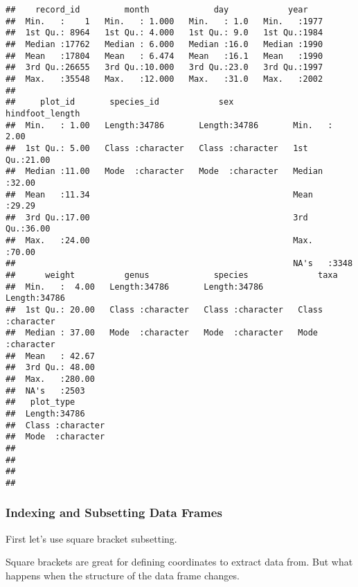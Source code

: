 \documentclass[]{article}
\begin{document}
\begin{verbatim}
##    record_id         month             day            year     
##  Min.   :    1   Min.   : 1.000   Min.   : 1.0   Min.   :1977  
##  1st Qu.: 8964   1st Qu.: 4.000   1st Qu.: 9.0   1st Qu.:1984  
##  Median :17762   Median : 6.000   Median :16.0   Median :1990  
##  Mean   :17804   Mean   : 6.474   Mean   :16.1   Mean   :1990  
##  3rd Qu.:26655   3rd Qu.:10.000   3rd Qu.:23.0   3rd Qu.:1997  
##  Max.   :35548   Max.   :12.000   Max.   :31.0   Max.   :2002  
##                                                                
##     plot_id       species_id            sex            hindfoot_length
##  Min.   : 1.00   Length:34786       Length:34786       Min.   : 2.00  
##  1st Qu.: 5.00   Class :character   Class :character   1st Qu.:21.00  
##  Median :11.00   Mode  :character   Mode  :character   Median :32.00  
##  Mean   :11.34                                         Mean   :29.29  
##  3rd Qu.:17.00                                         3rd Qu.:36.00  
##  Max.   :24.00                                         Max.   :70.00  
##                                                        NA's   :3348   
##      weight          genus             species              taxa          
##  Min.   :  4.00   Length:34786       Length:34786       Length:34786      
##  1st Qu.: 20.00   Class :character   Class :character   Class :character  
##  Median : 37.00   Mode  :character   Mode  :character   Mode  :character  
##  Mean   : 42.67                                                           
##  3rd Qu.: 48.00                                                           
##  Max.   :280.00                                                           
##  NA's   :2503                                                             
##   plot_type        
##  Length:34786      
##  Class :character  
##  Mode  :character  
##                    
##                    
##                    
## 
\end{verbatim}

\subsubsection{Indexing and Subsetting Data
Frames}\label{indexing-and-subsetting-data-frames}

First let's use square bracket subsetting.

Square brackets are great for defining coordinates to extract data from.
But what happens when the structure of the data frame changes.
\end{document}
